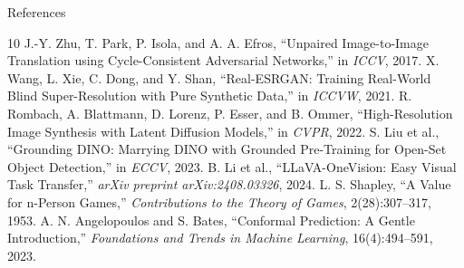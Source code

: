 \documentclass[aspectratio=169,11pt]{beamer}
\begin{document}
\begin{frame}[allowframebreaks]{References}
\tiny
\begin{thebibliography}{10}
 J.-Y. Zhu, T. Park, P. Isola, and A. A. Efros, ``Unpaired Image-to-Image Translation using Cycle-Consistent Adversarial Networks,'' in \textit{ICCV}, 2017.
 X. Wang, L. Xie, C. Dong, and Y. Shan, ``Real-ESRGAN: Training Real-World Blind Super-Resolution with Pure Synthetic Data,'' in \textit{ICCVW}, 2021.
 R. Rombach, A. Blattmann, D. Lorenz, P. Esser, and B. Ommer, ``High-Resolution Image Synthesis with Latent Diffusion Models,'' in \textit{CVPR}, 2022.
 S. Liu et al., ``Grounding DINO: Marrying DINO with Grounded Pre-Training for Open-Set Object Detection,'' in \textit{ECCV}, 2023.
 B. Li et al., ``LLaVA-OneVision: Easy Visual Task Transfer,'' \textit{arXiv preprint arXiv:2408.03326}, 2024.
 L. S. Shapley, ``A Value for n-Person Games,'' \textit{Contributions to the Theory of Games}, 2(28):307--317, 1953.
 A. N. Angelopoulos and S. Bates, ``Conformal Prediction: A Gentle Introduction,'' \textit{Foundations and Trends in Machine Learning}, 16(4):494--591, 2023.
\end{thebibliography}
\end{frame}
\end{document}

